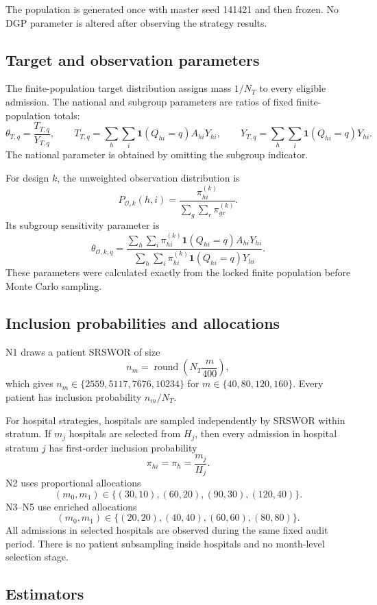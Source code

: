 The population is generated once with master seed 141421 and then frozen. No
DGP parameter is altered after observing the strategy results.

\subsection{Target and observation parameters}

The finite-population target distribution assigns mass \(1/N_T\) to every
eligible admission. The national and subgroup parameters are ratios of fixed
finite-population totals:
\[
  \theta_{T,q}
  =
  \frac{T_{T,q}}{Y_{T,q}},
  \qquad
  T_{T,q}=\sum_h\sum_i\mathbf 1(Q_{hi}=q)A_{hi}Y_{hi},
  \qquad
  Y_{T,q}=\sum_h\sum_i\mathbf 1(Q_{hi}=q)Y_{hi}.
\]
The national parameter is obtained by omitting the subgroup indicator.

For design \(k\), the unweighted observation distribution is
\[
  P_{\mathcal O,k}(h,i)
  =
  \frac{\pi_{hi}^{(k)}}{\sum_g\sum_r\pi_{gr}^{(k)}}.
\]
Its subgroup sensitivity parameter is
\[
  \theta_{\mathcal O,k,q}
  =
  \frac{
    \sum_h\sum_i \pi_{hi}^{(k)}\mathbf 1(Q_{hi}=q)A_{hi}Y_{hi}
  }{
    \sum_h\sum_i \pi_{hi}^{(k)}\mathbf 1(Q_{hi}=q)Y_{hi}
  }.
\]
These parameters were calculated exactly from the locked finite population
before Monte Carlo sampling.

\subsection{Inclusion probabilities and allocations}

N1 draws a patient SRSWOR of size
\[
  n_m
  =
  \operatorname{round}\left(N_T\frac{m}{400}\right),
\]
which gives \(n_m\in\{2559,5117,7676,10234\}\) for
\(m\in\{40,80,120,160\}\). Every patient has inclusion probability
\(n_m/N_T\).

For hospital strategies, hospitals are sampled independently by SRSWOR within
stratum. If \(m_j\) hospitals are selected from \(H_j\), then every admission
in hospital stratum \(j\) has first-order inclusion probability
\[
  \pi_{hi}=\pi_h=\frac{m_j}{H_j}.
\]
N2 uses proportional allocations
\[
  (m_0,m_1)
  \in
  \{(30,10),(60,20),(90,30),(120,40)\}.
\]
N3--N5 use enriched allocations
\[
  (m_0,m_1)
  \in
  \{(20,20),(40,40),(60,60),(80,80)\}.
\]
All admissions in selected hospitals are observed during the same fixed audit
period. There is no patient subsampling inside hospitals and no month-level
selection stage.

\subsection{Estimators}

